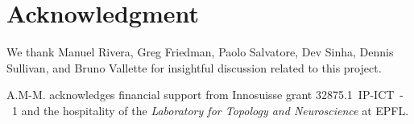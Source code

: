 
\section*{Acknowledgment}

We thank Manuel Rivera, Greg Friedman, Paolo Salvatore, Dev Sinha, Dennis Sullivan, and Bruno Vallette for insightful discussion related to this project.

A.M-M. acknowledges financial support from Innosuisse grant \mbox{32875.1 IP-ICT - 1} and the hospitality of the \textit{Laboratory for Topology and Neuroscience} at EPFL.

